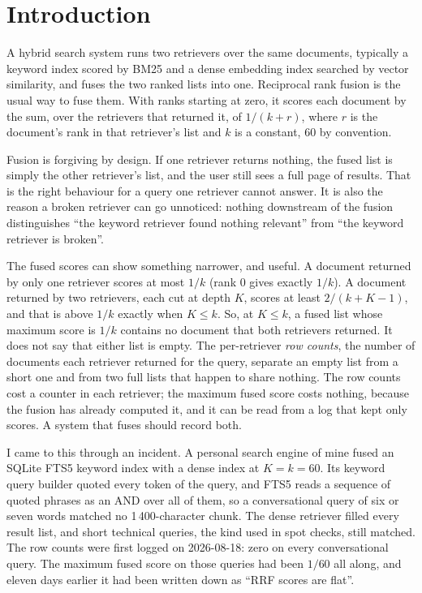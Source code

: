 \documentclass[11pt]{article}
\begin{document}
\section{Introduction}
\label{sec:intro}

A hybrid search system runs two retrievers over the same documents, typically a keyword index scored by BM25 and a dense embedding index searched by vector similarity, and fuses the two ranked lists into one. Reciprocal rank fusion \citep[RRF;][]{cormack2009rrf} is the usual way to fuse them. With ranks starting at zero, it scores each document by the sum, over the retrievers that returned it, of $1/(k+r)$, where $r$ is the document's rank in that retriever's list and $k$ is a constant, 60 by convention.

Fusion is forgiving by design. If one retriever returns nothing, the fused list is simply the other retriever's list, and the user still sees a full page of results. That is the right behaviour for a query one retriever cannot answer. It is also the reason a broken retriever can go unnoticed: nothing downstream of the fusion distinguishes ``the keyword retriever found nothing relevant'' from ``the keyword retriever is broken''.

The fused scores can show something narrower, and useful. A document returned by only one retriever scores at most $1/k$ (rank 0 gives exactly $1/k$). A document returned by two retrievers, each cut at depth $K$, scores at least $2/(k+K-1)$, and that is above $1/k$ exactly when $K \le k$. So, at $K \le k$, a fused list whose maximum score is $1/k$ contains no document that both retrievers returned. It does not say that either list is empty. The per-retriever \emph{row counts}, the number of documents each retriever returned for the query, separate an empty list from a short one and from two full lists that happen to share nothing. The row counts cost a counter in each retriever; the maximum fused score costs nothing, because the fusion has already computed it, and it can be read from a log that kept only scores. A system that fuses should record both.

I came to this through an incident. A personal search engine of mine fused an SQLite FTS5 keyword index with a dense index at $K = k = 60$. Its keyword query builder quoted every token of the query, and FTS5 reads a sequence of quoted phrases as an AND over all of them, so a conversational query of six or seven words matched no 1\,400-character chunk. The dense retriever filled every result list, and short technical queries, the kind used in spot checks, still matched. The row counts were first logged on 2026-08-18: zero on every conversational query. The maximum fused score on those queries had been $1/60$ all along, and eleven days earlier it had been written down as ``RRF scores are flat''.
\end{document}
